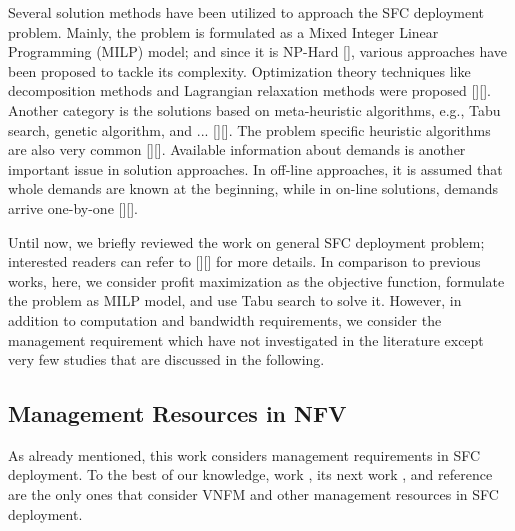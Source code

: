 Several solution methods have been utilized to approach the SFC deployment problem. Mainly, the problem is formulated as a Mixed Integer Linear Programming (MILP) model; and since it is NP-Hard [], various approaches have been proposed to tackle its complexity. Optimization theory techniques like decomposition methods and Lagrangian relaxation methods were proposed [][]. Another category is the solutions based on meta-heuristic algorithms, e.g., Tabu search, genetic algorithm, and ... [][]. The problem specific heuristic algorithms are also very common [][]. Available information about demands is another important issue in solution approaches. In off-line approaches, it is assumed that whole demands are known at the beginning, while in on-line solutions, demands arrive one-by-one [][].


Until now, we briefly reviewed the work on general SFC deployment problem; interested readers can refer to [][] for more details. In comparison to previous works, here, we consider profit maximization as the objective function, formulate the problem as MILP model, and use Tabu search to solve it. However, in addition to computation and bandwidth requirements, we consider the management requirement which have not investigated in the literature except very few studies that are discussed in the following. 


\subsection{Management Resources in NFV}
As already mentioned, this work considers management requirements in SFC deployment. To the best of our knowledge, work \cite{AbuLebdeh2017}, its next work \cite{AbuLebdeh20172}, and reference \cite{Chiang2019} are the only ones that consider VNFM and other management resources in SFC deployment.


